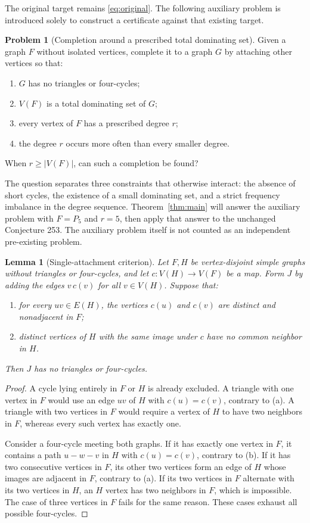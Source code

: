 \documentclass[11pt,a4paper]{article}
\newtheorem{lemma}[theorem]{Lemma}
\theoremstyle{definition}
\newtheorem{problem}[theorem]{Problem}
\theoremstyle{remark}
\begin{document}
The original target remains \eqref{eq:original}. The following
auxiliary problem is introduced solely to construct a certificate
against that existing target.

\begin{problem}[Completion around a prescribed total dominating set]
\label{prob:completion}
Given a graph $F$ without isolated vertices, complete it to a graph
$G$ by attaching other vertices so that:
\begin{enumerate}[label=(\roman*)]
\item $G$ has no triangles or four-cycles;
\item $V(F)$ is a total dominating set of $G$;
\item every vertex of $F$ has a prescribed degree $r$;
\item the degree $r$ occurs more often than every smaller degree.
\end{enumerate}
When $r\ge |V(F)|$, can such a completion be found?
\end{problem}

The question separates three constraints that otherwise interact:
the absence of short cycles, the existence of a small dominating
set, and a strict frequency imbalance in the degree sequence.
Theorem~\ref{thm:main} will answer the auxiliary problem with
$F=P_5$ and $r=5$, then apply that answer to the unchanged
Conjecture 253. The auxiliary problem itself is not counted as an
independent pre-existing problem.

\begin{lemma}[Single-attachment criterion]\label{lem:attachment}
Let $F,H$ be vertex-disjoint simple graphs without triangles or
four-cycles, and let $c:V(H)\to V(F)$ be a map. Form $J$ by adding
the edges $v\,c(v)$ for all $v\in V(H)$. Suppose that:
\begin{enumerate}[label=(\alph*)]
\item for every $uv\in E(H)$, the vertices $c(u)$ and $c(v)$ are
distinct and nonadjacent in $F$;
\item distinct vertices of $H$ with the same image under $c$ have
no common neighbor in $H$.
\end{enumerate}
Then $J$ has no triangles or four-cycles.
\end{lemma}

\begin{proof}
A cycle lying entirely in $F$ or $H$ is already excluded.
A triangle with one vertex in $F$ would use an edge $uv$ of $H$
with $c(u)=c(v)$, contrary to (a). A triangle with two vertices in
$F$ would require a vertex of $H$ to have two neighbors in $F$,
whereas every such vertex has exactly one.

Consider a four-cycle meeting both graphs. If it has exactly one
vertex in $F$, it contains a path $u-w-v$ in $H$ with
$c(u)=c(v)$, contrary to (b). If it has two consecutive vertices
in $F$, its other two vertices form an edge of $H$ whose images
are adjacent in $F$, contrary to (a). If its two vertices in $F$
alternate with its two vertices in $H$, an $H$ vertex has two
neighbors in $F$, which is impossible. The case of three vertices
in $F$ fails for the same reason. These cases exhaust all possible
four-cycles.
\end{proof}
\end{document}
